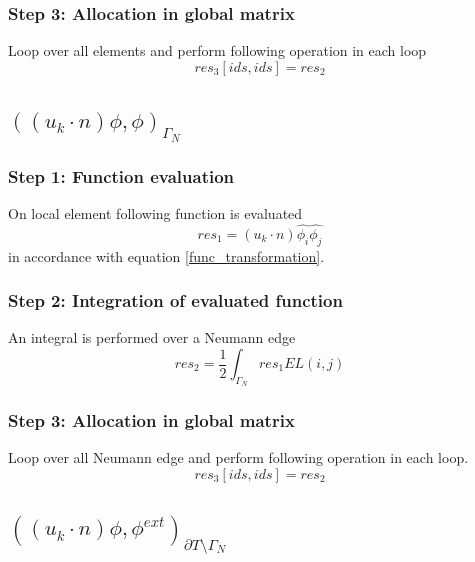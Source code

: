 \documentclass[a4paper,openany]{book}
\begin{document}
\subsubsection{Step 3: Allocation in global matrix}

Loop over all elements and perform following operation in each loop 
\begin{equation}
res_3[ids,ids]=res_2
\end{equation}

\subsection{$((u_k \cdot n)\phi , \phi)_{\Gamma_N}$} 

\subsubsection{Step 1: Function evaluation}

On local element following function is evaluated 
\begin{equation}
res_1 = (u_k \cdot n) \hat{\phi_i} \hat{\phi_j}
\end{equation} 
in accordance with equation \ref{func_transformation}.\\

\subsubsection{Step 2: Integration of evaluated function}

An integral is performed over a Neumann edge 
\begin{equation}
res_2 = \frac{1}{2}  \int_{\Gamma_N} res_1 EL(i,j)
\end{equation}

\subsubsection{Step 3: Allocation in global matrix}

Loop over all Neumann edge and perform following operation in each loop.
\begin{equation}
res_3[ids,ids] = res_2
\end{equation}

\subsection{$((u_k \cdot n)\phi,\phi^{ext})_{\partial T \setminus \Gamma_N}$}
\end{document}
